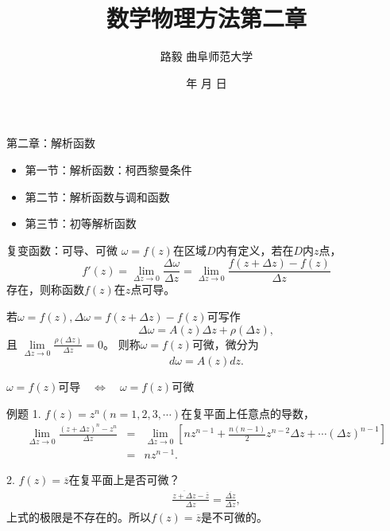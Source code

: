 \documentclass[11pt]{beamer}
\newcommand{\kong}[1][0.5]{\vspace{#1cm}}
\begin{document}
	\author{ 路毅 \hspace{0.3cm} 曲阜师范大学 }
	\date{\number\year 年 \number\month 月 \number\day 日}
	\title{数学物理方法第二章}

\begin{frame}
	\maketitle
\end{frame}

\kaishu

\begin{frame}{第二章：解析函数}
\begin{itemize}
	\item 第一节：解析函数：柯西黎曼条件
	\vspace{1cm}
	\item 第二节：解析函数与调和函数
	\vspace{1cm}
	\item 第三节：初等解析函数
\end{itemize}
\end{frame}

\begin{frame}{复变函数：可导、可微}
$\omega = f(z)$在区域$D$内有定义，若在$D$内$z$点，
\begin{equation}
f'(z) = \lim\limits_{\Delta z \rightarrow 0} \frac{\Delta \omega}{ \Delta z }
= \lim\limits_{\Delta z \rightarrow 0} \frac{ f(z + \Delta z) - f(z) }{\Delta z}
\end{equation}
存在，则称函数$f(z)$在$z$点可导。

\kong[1]

若$\omega = f(z), \Delta \omega = f(z + \Delta z) - f(z)$可写作
\begin{equation}
\Delta \omega = A(z) \Delta z + \rho(\Delta z),
\end{equation}
且 $\lim\limits_{\Delta z \rightarrow 0} \frac{ \rho(\Delta z) }{ \Delta z } = 0$。
则称$\omega = f(z)$可微，微分为
\begin{equation}
d \omega = A(z) dz.
\end{equation}

\kong[0.5]
$\omega = f(z)$可导　$\Leftrightarrow$　$\omega = f(z)$可微


\end{frame}

\begin{frame}{例题}
1. $f(z) = z^n (n=1,2,3,\cdots)$在复平面上任意点的导数，
\begin{eqnarray}
\lim\limits_{\Delta z \rightarrow 0} \frac{ (z + \Delta z)^n - z^n}{\Delta z} 
&=& \lim\limits_{\Delta z \rightarrow 0} [ nz^{n-1} +  \frac{n(n-1)}{2}z^{n-2}\Delta z + \cdots (\Delta z)^{n-1} ] 
\nonumber \\
&=& nz^{n-1}.
\end{eqnarray}

2. $f(z)=\overline{z}$在复平面上是否可微？
\begin{eqnarray}
\frac{ \overline{z+\Delta z} - \overline{z} }{ \Delta z }
= \frac{ \overline{\Delta z} }{ \Delta z },
\end{eqnarray}
上式的极限是不存在的。所以$f(z)=\overline{z}$是不可微的。
\end{frame}
\end{document}
